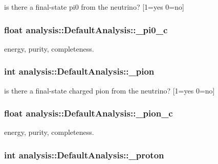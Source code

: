 is there a final-\/state pi0 from the neutrino? \mbox{[}1=yes 0=no\mbox{]} \hypertarget{classanalysis_1_1DefaultAnalysis_a255069926e7e8a83629b9dac19bf7473}{
\subsubsection[{\-\_\-pi0\-\_\-c}]{\setlength{\rightskip}{0pt plus 5cm}float analysis\-::\-Default\-Analysis\-::\-\_\-pi0\-\_\-c\hspace{0.3cm}{\ttfamily [private]}}}\label{classanalysis_1_1DefaultAnalysis_a255069926e7e8a83629b9dac19bf7473}
energy, purity, completeness. \hypertarget{classanalysis_1_1DefaultAnalysis_ac146d38b0cac5f30ea28c76f21cacdb1}{
\subsubsection[{\-\_\-pion}]{\setlength{\rightskip}{0pt plus 5cm}int analysis\-::\-Default\-Analysis\-::\-\_\-pion\hspace{0.3cm}{\ttfamily [private]}}}\label{classanalysis_1_1DefaultAnalysis_ac146d38b0cac5f30ea28c76f21cacdb1}
is there a final-\/state charged pion from the neutrino? \mbox{[}1=yes 0=no\mbox{]} \hypertarget{classanalysis_1_1DefaultAnalysis_a9978effbcfba62536fc88a73fa985fe9}{
\subsubsection[{\-\_\-pion\-\_\-c}]{\setlength{\rightskip}{0pt plus 5cm}float analysis\-::\-Default\-Analysis\-::\-\_\-pion\-\_\-c\hspace{0.3cm}{\ttfamily [private]}}}\label{classanalysis_1_1DefaultAnalysis_a9978effbcfba62536fc88a73fa985fe9}
energy, purity, completeness. \hypertarget{classanalysis_1_1DefaultAnalysis_a8fd1f5d981dc5860f0c829c2b88a1363}{
\subsubsection[{\-\_\-proton}]{\setlength{\rightskip}{0pt plus 5cm}int analysis\-::\-Default\-Analysis\-::\-\_\-proton\hspace{0.3cm}{\ttfamily [private]}}}\label{classanalysis_1_1DefaultAnalysis_a8fd1f5d981dc5860f0c829c2b88a1363}
